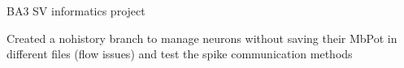 B\-A3 S\-V informatics project

Created a nohistory branch to manage neurons without saving their Mb\-Pot in different files (flow issues) and test the spike communication methods 